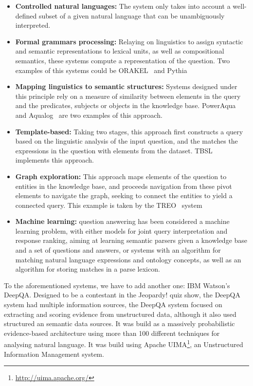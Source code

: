 \begin{itemize}
  \item \textbf{Controlled natural languages:} The system only takes into account a well-defined subset of a given natural language that can be unambiguously interpreted.
  \item \textbf{Formal grammars processing:} Relaying on linguistics to assign syntactic and semantic representations to lexical units, as well as compositional semantics, these systems compute a representation of the question. Two examples of this systems could be ORAKEL~\cite{cimiano2008towards} and Pythia~\cite{unger2011pythia}
  \item \textbf{Mapping linguistics to semantic structures:} Systems designed under this principle rely on a measure of similarity between elements in the query and the predicates, subjects or objects in the knowledge base. PowerAqua~\cite{lopez2011poweraqua} and Aqualog~\cite{lopez2007aqualog} are two examples of this approach.
  \item \textbf{Template-based:} Taking two stages, this approach first constructs a query based on the linguistic analysis of the input question, and the matches the expressions in the question with elements from the dataset. TBSL~\cite{unger2012template} implements this approach.
  \item \textbf{Graph exploration:} This approach maps elements of the question to entities in the knowledge base, and proceeds navigation from these pivot elements to navigate the graph, seeking to connect the entities to yield a connected query. This example is taken by the TREO~\cite{freitas2011querying} system
  \item \textbf{Machine learning:} question answering has been considered a machine learning problem, with either models for joint query interpretation and response ranking, aiming at learning semantic parsers given a knowledge base and a set of questions and answers, or systems with an algorithm for matching natural language expressions and ontology concepts, as well as an algorithm for storing matches in a parse lexicon.
\end{itemize}


To the aforementioned systems, we have to add another one: IBM Watson's DeepQA. Designed to be a contestant in the Jeopardy! quiz show, the DeepQA system had multiple information sources, the DeepQA system focused on extracting and scoring evidence from unstructured data, although it also used structured an semantic data sources. It was build as a massively probabilistic evidence-based architecture using more than 100 different techniques for analysing natural language. It was build using Apache UIMA\footnote{\url{http://uima.apache.org/}}, an Unstructured Information Management system.

